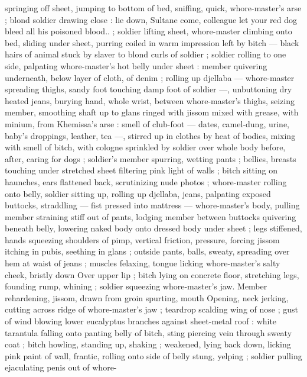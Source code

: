 springing off sheet, jumping to bottom of bed, sniffing, quick, 
whore-master's arse ; blond soldier drawing close : {\td} {\gl} {\td} lie down, 
Sultane{\thd} come, colleague{\thd} let your red dog bleed all his poisoned 
blood..{\gr} ; soldier lifting sheet, whore-master climbing onto bed, 
sliding under sheet, purring coiled in warm impression left by bitch 
--- black hairs of animal stuck by slaver to blond curls of soldier ; 
soldier rolling to one side, palpating whore-master's hot belly under 
sheet : member quivering underneath, below layer of cloth, of denim 
; rolling up djellaba --- whore-master spreading thighs, sandy foot 
touching damp foot of soldier ---, unbuttoning dry heated jeans, 
burying hand, whole wrist, between whore-master's thighs, seizing 
member, smoothing shaft up to glans ringed with jissom mixed with 
grease, with minium, from Khemissa's arse : smell of club-foot --- 
dates, camel-dung, urine, baby's droppings, leather, tea ---, stirred 
up in clothes by heat of bodies, mixing with smell of bitch, with 
cologne sprinkled by soldier over whole body before, after, caring for 
dogs ; soldier's member spurring, wetting pants ; bellies, breasts 
touching under stretched sheet filtering pink light of walls ; bitch 
sitting on haunches, ears flattened back, scrutinizing nude photos ; 
whore-master rolling onto belly, soldier sitting up, rolling up djellaba, 
jeans, palpating exposed buttocks, straddling --- fist pressed into 
mattress --- whore-master's body, pulling member straining stiff out 
of pants, lodging member between buttocks quivering beneath belly, 
lowering naked body onto dressed body under sheet ; legs stiffened, 
hands squeezing shoulders of pimp, vertical friction, pressure, 
forcing jissom itching in pubis, seething in glans ; outside pants, 
balls, sweaty, spreading over hem at waist of jeans ; muscles 
felaxing, tongue licking whore-master's salty cheek, bristly down 
Over upper lip ; bitch lying on concrete floor, stretching legs, 
founding rump, whining ; soldier squeezing whore-master's jaw. 
Member rehardening, jissom, drawn from groin spurting, mouth 
Opening, neck jerking, cutting across ridge of whore-master's jaw ; 
teardrop scalding wing of nose ; gust of wind blowing lower 
eucalyptus branches against sheet-metal roof : white tarantula 
falling onto panting belly of bitch, sting piercing vein through sweaty 
coat ; bitch howling, standing up, shaking ; weakened, lying back 
down, licking pink paint of wall, frantic, rolling onto side of belly 
stung, yelping ; soldier pulling ejaculating penis out of whore- 
